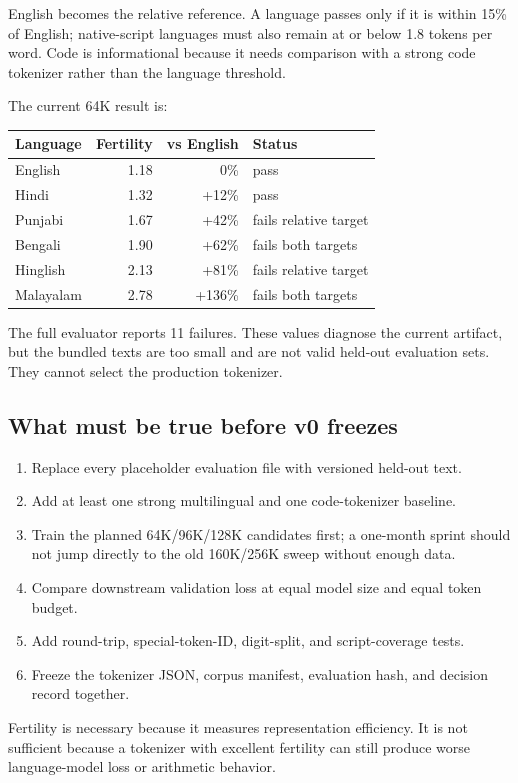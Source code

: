 English becomes the relative reference. A language passes only if it is within
15\% of English; native-script languages must also remain at or below 1.8
tokens per word. Code is informational because it needs comparison with a
strong code tokenizer rather than the language threshold.

The current 64K result is:

\begin{center}
  \renewcommand{\arraystretch}{1.15}
  \small
  \begin{tabular}{@{}l r r l@{}}
    \textbf{Language} & \textbf{Fertility} & \textbf{vs English} &
    \textbf{Status} \\
    \hline
    English & 1.18 & 0\% & pass \\
    Hindi & 1.32 & +12\% & pass \\
    Punjabi & 1.67 & +42\% & fails relative target \\
    Bengali & 1.90 & +62\% & fails both targets \\
    Hinglish & 2.13 & +81\% & fails relative target \\
    Malayalam & 2.78 & +136\% & fails both targets
  \end{tabular}
\end{center}

The full evaluator reports 11 failures. These values diagnose the current
artifact, but the bundled texts are too small and are not valid held-out
evaluation sets. They cannot select the production tokenizer.

\subsection{What must be true before v0 freezes}

\begin{enumerate}
    \setlength{\itemsep}{0pt}
  \item Replace every placeholder evaluation file with versioned
    held-out text.
  \item Add at least one strong multilingual and one code-tokenizer baseline.
  \item Train the planned 64K/96K/128K candidates first; a one-month sprint
    should not jump directly to the old 160K/256K sweep without enough data.
  \item Compare downstream validation loss at equal model size and
    equal token budget.
  \item Add round-trip, special-token-ID, digit-split, and
    script-coverage tests.
  \item Freeze the tokenizer JSON, corpus manifest, evaluation hash,
    and decision record together.
\end{enumerate}

Fertility is necessary because it measures representation efficiency. It is
not sufficient because a tokenizer with excellent fertility can still produce
worse language-model loss or arithmetic behavior.
